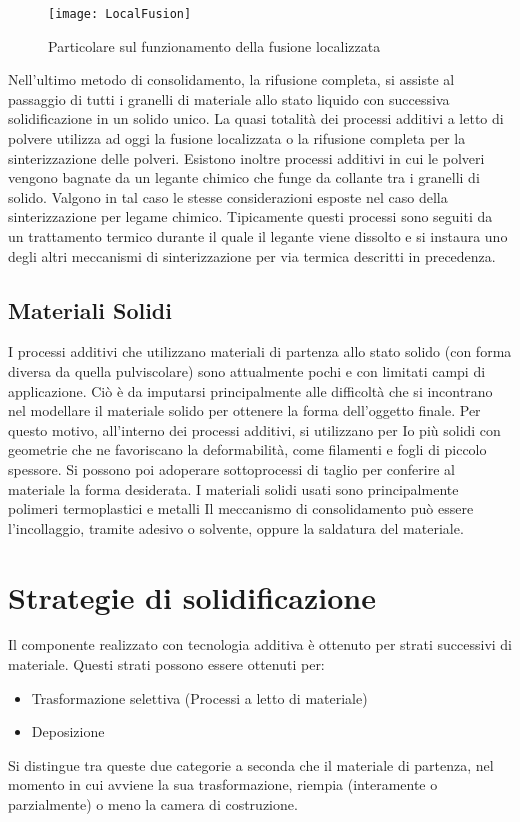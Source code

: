 \begin{figure}
\centering
\texttt{[image: LocalFusion]}
\caption{Particolare sul funzionamento della fusione localizzata}
\label{fig:LocalFusion}
\end{figure}

Nell'ultimo metodo di consolidamento, la rifusione completa, si assiste al passaggio di tutti i
granelli di materiale allo stato liquido con successiva solidificazione in un solido unico.
La quasi totalità dei processi additivi a letto di polvere utilizza ad oggi la fusione localizzata
o la rifusione completa per la sinterizzazione delle polveri.
Esistono inoltre processi additivi in cui le polveri vengono bagnate da un legante chimico
che funge da collante tra i granelli di solido. Valgono in tal caso le stesse considerazioni
esposte nel caso della sinterizzazione per legame chimico.
Tipicamente questi processi sono seguiti da un trattamento termico durante il quale il
legante viene dissolto e si instaura uno degli altri meccanismi di sinterizzazione per via
termica descritti in precedenza.

\subsection{Materiali Solidi}
I processi additivi che utilizzano materiali di partenza allo stato solido (con forma diversa da
quella pulviscolare) sono attualmente pochi e con limitati campi di applicazione.
Ciò è da imputarsi principalmente alle difficoltà che si incontrano nel modellare il materiale
solido per ottenere la forma dell'oggetto finale.
Per questo motivo, all'interno dei processi additivi, si utilizzano per Io più solidi con
geometrie che ne favoriscano la deformabilità, come filamenti e fogli di piccolo spessore.
Si possono poi adoperare sottoprocessi di taglio per conferire al materiale la forma
desiderata.
I materiali solidi usati sono principalmente polimeri termoplastici e metalli
Il meccanismo di consolidamento può essere l'incollaggio, tramite adesivo o solvente,
oppure la saldatura del materiale.

\section{Strategie di solidificazione}
Il componente realizzato con tecnologia additiva è ottenuto per strati successivi di materiale.
Questi strati possono essere ottenuti per:
\begin{itemize}
\item Trasformazione selettiva (Processi a letto di materiale)
\item Deposizione
\end{itemize}
Si distingue tra queste due categorie a seconda che il materiale di partenza, nel momento
in cui avviene la sua trasformazione, riempia (interamente o parzialmente) o meno la
camera di costruzione.

